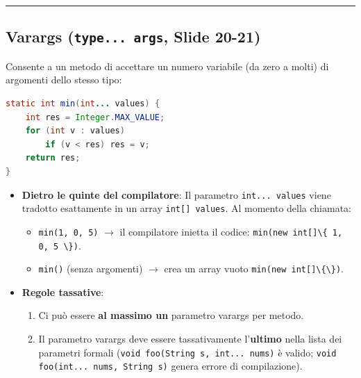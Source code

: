 \documentclass[11pt,a4paper,oneside]{report}
\newcommand{\passthrough}[1]{#1}
\providecommand{\tightlist}{\setlength{\itemsep}{0pt}\setlength{\parskip}{0pt}}
\begin{document}
\begin{center}\rule{0.5\linewidth}{0.5pt}\end{center}

\subsection{\texorpdfstring{Varargs (\texttt{type...\ args}, Slide
20-21)}{Varargs (type... args, Slide 20-21)}}\label{chap13_varargs-type...-args-slide-20-21}

Consente a un metodo di accettare un numero variabile (da zero a molti)
di argomenti dello stesso tipo:

\begin{lstlisting}[language=Java]
static int min(int... values) {
    int res = Integer.MAX_VALUE;
    for (int v : values)
        if (v < res) res = v;
    return res;
}
\end{lstlisting}

\begin{itemize}
\tightlist
\item
  \textbf{Dietro le quinte del compilatore}: Il parametro
  \passthrough{\lstinline!int... values!} viene tradotto esattamente in
  un array \passthrough{\lstinline!int[] values!}. Al momento della
  chiamata:

  \begin{itemize}
  \tightlist
  \item
    \passthrough{\lstinline!min(1, 0, 5)!} \(\rightarrow\) il
    compilatore inietta il codice:
    \passthrough{\lstinline!min(new int[]\{ 1, 0, 5 \})!}.
  \item
    \passthrough{\lstinline!min()!} (senza argomenti) \(\rightarrow\)
    crea un array vuoto \passthrough{\lstinline!min(new int[]\{\})!}.
  \end{itemize}
\item
  \textbf{Regole tassative}:

  \begin{enumerate}
  \def\labelenumi{\arabic{enumi}.}
  \tightlist
  \item
    Ci può essere \textbf{al massimo un} parametro varargs per metodo.
  \item
    Il parametro varargs deve essere tassativamente l'\textbf{ultimo}
    nella lista dei parametri formali
    (\passthrough{\lstinline!void foo(String s, int... nums)!} è valido;
    \passthrough{\lstinline!void foo(int... nums, String s)!} genera
    errore di compilazione).
  \end{enumerate}
\end{itemize}
\end{document}
